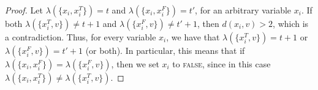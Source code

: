 \documentclass[a4paper,UKenglish,cleveref, autoref, thm-restate, anonymous]{lipics-v2021}
\begin{document}
\begin{proof}
Let $\lambda(\{x_i, x_i^T\})=t$ and $\lambda(\{x_i, x_i^F\})=t'$, for an arbitrary variable $x_i$. 
If both $\lambda(\{x_i^T, v\})\neq t+1$ and $\lambda(\{x_i^F, v\})\neq t'+1$, then $d(x_i,v)>2$, which is a contradiction. 
Thus, for every variable $x_i$, we have that $\lambda(\{x_i^T, v\})= t+1$ or $\lambda(\{x_i^F, v\})= t'+1$ (or both). 
In particular, this means that if $\lambda(\{x_i, x_i^F\})=\lambda(\{x_i^F, v\})$, then we set $x_i$ to \textsc{false}, since in this case $\lambda(\{x_i, x_i^T\})\neq\lambda(\{x_i^T, v\})$.



\end{proof}
\end{document}
